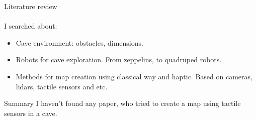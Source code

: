 \documentclass[aspectratio=169]{beamer}
\begin{document}




\begin{frame}[t]{Literature review}
    \framesubtitle{}
    \Large
    I searched about:
    \begin{itemize}
        \item Cave environment: obstacles, dimensions.
        \item Robots for cave exploration. From zeppelins, to quadruped robots.
        \item Methods for map creation using classical way and haptic. Based on cameras, lidars, tactile sensors and etc.
    \end{itemize}
    \begin{block}{Summary}
        I haven't found any paper, who tried to create a map using tactile sensors in a cave.
    \end{block}
\end{frame}
\end{document}
